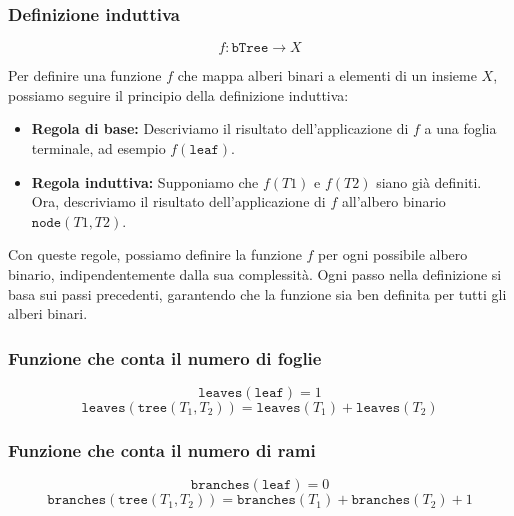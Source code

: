 \subsubsection{Definizione induttiva}
\[
f: \texttt{bTree} \rightarrow X  
\]

Per definire una funzione $f$ che mappa alberi binari a elementi di un insieme $X$, possiamo seguire il principio della definizione induttiva:

\begin{itemize}
  \item \textbf{Regola di base:} Descriviamo il risultato dell'applicazione di $f$ a una foglia terminale, ad esempio $f(\texttt{leaf})$.

  \item \textbf{Regola induttiva:} Supponiamo che $f(T1)$ e $f(T2)$ siano già definiti. Ora, descriviamo il risultato dell'applicazione di
  $f$ all'albero binario $\texttt{node}(T1, T2)$.
\end{itemize}

Con queste regole, possiamo definire la funzione $f$ per ogni possibile albero binario, indipendentemente dalla sua complessità. Ogni passo nella definizione
si basa sui passi precedenti, garantendo che la funzione sia ben definita per tutti gli alberi binari.


\subsubsection{Funzione che conta il numero di foglie}
\[
\texttt{leaves}(\texttt{leaf}) = 1
\]
\[
\texttt{leaves}(\texttt{tree}(T_1, T_2)) = \texttt{leaves}(T_1) + \texttt{leaves}(T_2)
\]
\subsubsection{Funzione che conta il numero di rami}
\[
\texttt{branches}(\texttt{leaf}) = 0
\]
\[
\texttt{branches}(\texttt{tree}(T_1, T_2)) = \texttt{branches}(T_1) + \texttt{branches}(T_2) + 1
\]